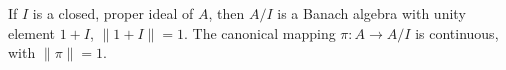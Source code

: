 If $I$ is a closed, proper ideal of $A$, then $A/I$ is a Banach algebra with unity element $1 + I$, $\|1 + I\| = 1$. The canonical mapping $\pi: A \to A/I$ is continuous, with $\|\pi\| = 1$.
